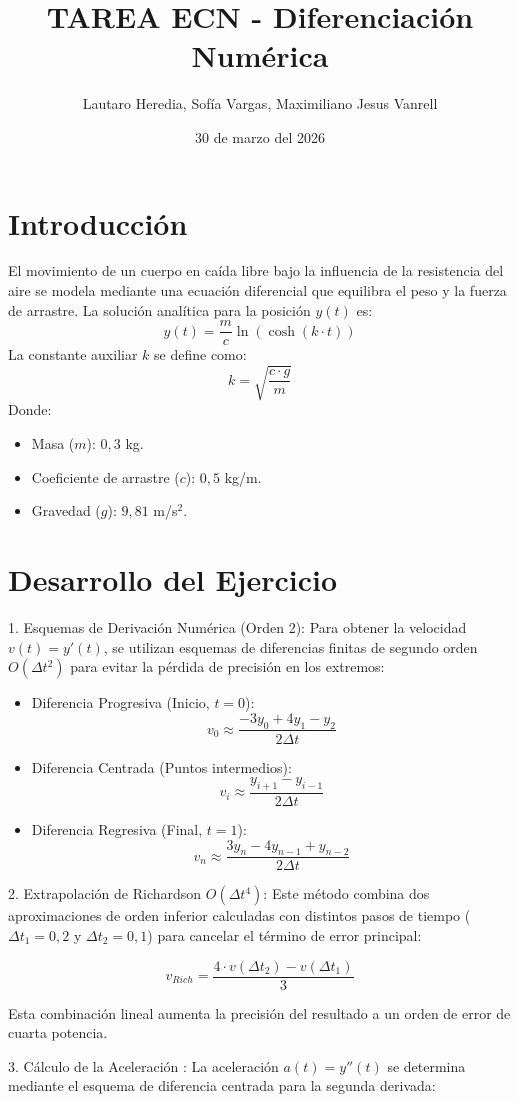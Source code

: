 \documentclass{article}
\title{TAREA ECN - Diferenciación Numérica}
\author{Lautaro Heredia, Sofía Vargas, Maximiliano Jesus Vanrell}
\date{30 de marzo del 2026}
\begin{document}
	
	\maketitle 
	\section{Introducción}
	El movimiento de un cuerpo en caída libre bajo la influencia de la resistencia del aire se modela mediante una ecuación diferencial que equilibra el peso y la fuerza de arrastre. La solución analítica para la posición $y(t)$ es: 
	$$y(t) = \frac{m}{c} \ln\left(\cosh\left(k \cdot t\right)\right)$$
	La constante auxiliar $k$ se define como:
	$$k = \sqrt{\frac{c \cdot g}{m}}$$
	Donde:
	\begin{itemize}
		\item Masa ($m$): $0,3$ kg.
		\item Coeficiente de arrastre ($c$): $0,5$ kg/m.
		\item Gravedad ($g$): $9,81$ m/s$^2$.
	\end{itemize}
	\section{Desarrollo del Ejercicio}
	1. Esquemas de Derivación Numérica (Orden 2): Para obtener la velocidad $v(t) = y'(t)$, se utilizan esquemas de diferencias finitas de segundo orden $O(\Delta t^2)$ para evitar la pérdida de precisión en los extremos:
	\begin{itemize}
		\item Diferencia Progresiva (Inicio, $t=0$):$$v_0 \approx \frac{-3y_0 + 4y_1 - y_2}{2\Delta t}$$
		\item Diferencia Centrada (Puntos intermedios):$$v_i \approx \frac{y_{i+1} - y_{i-1}}{2\Delta t}$$
		\item Diferencia Regresiva (Final, $t=1$):$$v_n \approx \frac{3y_n - 4y_{n-1} + y_{n-2}}{2\Delta t}$$
	\end{itemize}
	2. Extrapolación de Richardson $O(\Delta t^4)$:
	Este método combina dos aproximaciones de orden inferior calculadas con distintos pasos de tiempo ($\Delta t_{1} = 0,2$ y $\Delta t_{2} = 0,1$) para cancelar el término de error principal:
	
	$$v_{Rich} = \frac{4 \cdot v(\Delta t_{2}) - v(\Delta t_{1})}{3}$$
	
	Esta combinación lineal aumenta la precisión del resultado a un orden de error de cuarta potencia.
	
	
	3. Cálculo de la Aceleración : La aceleración $a(t) = y''(t)$ se determina mediante el esquema de diferencia centrada para la segunda derivada:
	
\end{document}
